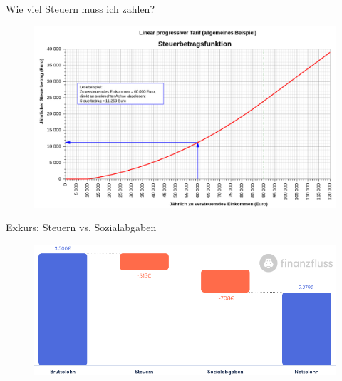 \documentclass{beamer}
\begin{document}
			\begin{frame}{Wie viel Steuern muss ich zahlen?}
				\begin{center}
					\vspace{-0.5cm}
					\begin{figure}
						\includegraphics[width=0.9\linewidth]{images/tarifzonen-steuerfunktion-diagramm}
					\end{figure}
				\end{center}
			\end{frame}
			
			\begin{frame}{Exkurs: Steuern vs. Sozialabgaben}
				\begin{center}
					\vspace{-0.5cm}
					\begin{figure}
						\includegraphics[width=0.8\linewidth]{images/steuerrechner}
					\end{figure}
				\end{center}
			\end{frame}
			
\end{document}

